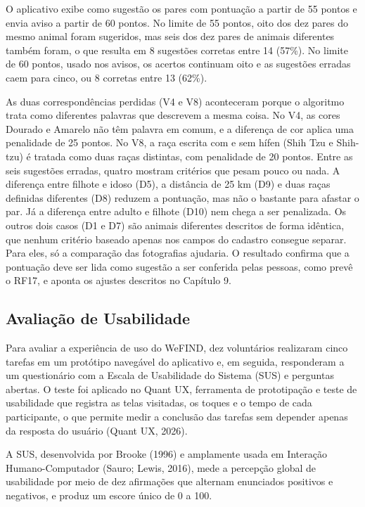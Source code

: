 O aplicativo exibe como sugestão os pares com pontuação a partir de 55 pontos e envia aviso a partir de 60 pontos. No limite de 55 pontos, oito dos dez pares do mesmo animal foram sugeridos, mas seis dos dez pares de animais diferentes também foram, o que resulta em 8 sugestões corretas entre 14 (57\%). No limite de 60 pontos, usado nos avisos, os acertos continuam oito e as sugestões erradas caem para cinco, ou 8 corretas entre 13 (62\%).

As duas correspondências perdidas (V4 e V8) aconteceram porque o algoritmo trata como diferentes palavras que descrevem a mesma coisa. No V4, as cores Dourado e Amarelo não têm palavra em comum, e a diferença de cor aplica uma penalidade de 25 pontos. No V8, a raça escrita com e sem hífen (Shih Tzu e Shih-tzu) é tratada como duas raças distintas, com penalidade de 20 pontos. Entre as seis sugestões erradas, quatro mostram critérios que pesam pouco ou nada. A diferença entre filhote e idoso (D5), a distância de 25 km (D9) e duas raças definidas diferentes (D8) reduzem a pontuação, mas não o bastante para afastar o par. Já a diferença entre adulto e filhote (D10) nem chega a ser penalizada. Os outros dois casos (D1 e D7) são animais diferentes descritos de forma idêntica, que nenhum critério baseado apenas nos campos do cadastro consegue separar. Para eles, só a comparação das fotografias ajudaria. O resultado confirma que a pontuação deve ser lida como sugestão a ser conferida pelas pessoas, como prevê o RF17, e aponta os ajustes descritos no Capítulo 9.

\subsection{Avaliação de Usabilidade}

Para avaliar a experiência de uso do WeFIND, dez voluntários realizaram cinco tarefas em um protótipo navegável do aplicativo e, em seguida, responderam a um questionário com a Escala de Usabilidade do Sistema (SUS) e perguntas abertas. O teste foi aplicado no Quant UX, ferramenta de prototipação e teste de usabilidade que registra as telas visitadas, os toques e o tempo de cada participante, o que permite medir a conclusão das tarefas sem depender apenas da resposta do usuário (Quant UX, 2026).

A SUS, desenvolvida por Brooke (1996) e amplamente usada em Interação Humano-Computador (Sauro; Lewis, 2016), mede a percepção global de usabilidade por meio de dez afirmações que alternam enunciados positivos e negativos, e produz um escore único de 0 a 100.

